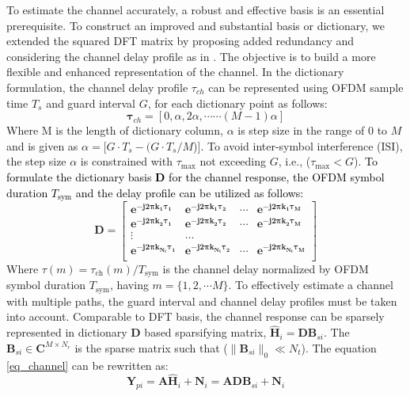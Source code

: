 To estimate the channel accurately, a robust and effective basis is an essential prerequisite. To construct an improved and substantial basis or dictionary, we extended the squared DFT matrix by proposing added redundancy and considering the channel delay profile as in \cite{ourwork}. The objective is to build a more flexible and enhanced representation of the channel. In the dictionary formulation, the channel delay profile $\tau_{ch}$ can be represented using OFDM sample time $T_s$ and guard interval $G$, for each dictionary point as follows:
    \begin{equation}
\mathbf{    
\tau}_{ch}=[0,\alpha,2\alpha,\cdots \cdots (M-1)\alpha]
    \end{equation}  
 Where M is the length of dictionary column, $\alpha$ is step size in the range of $0$ to $M$ and is given as $\alpha=[G\cdot T_s-(G\cdot T_s/M$)]. To avoid inter-symbol interference (ISI), the step size $\alpha$ is constrained with $\tau_\text{max}$  not exceeding $G$, i.e., ($\tau_\text{max}< G$)\cite{reviwsparse}.
\textcolor{black}{To formulate the dictionary basis $\mathbf{D}$ for the channel response, the OFDM symbol duration $T_\text{sym}$ and the delay profile can be utilized as follows:}\\
\[
\mathbf{    D=
    \begin{bmatrix}
    e^{-j2\pi k_1 \tau_1} & e^{-j2\pi k_1 \tau_2}&\cdots& e^{-j2\pi k_1 \tau_M} \\
    e^{-j2\pi k_2 \tau_1} & e^{-j2\pi k_2 \tau_2}&\cdots& e^{-j2\pi k_2 \tau_M} \\
    \vdots & \dots & \\                                        
    e^{-j2\pi k_{N_t}\tau_1} & e^{-j2\pi k_{N_t}\tau_2} &\cdots& e^{-j2\pi k_{N_t}\tau_M} \\
    \end{bmatrix}
    }    \]
Where $\tau(m)=  \tau_\text{ch}(m)/T_\text{sym}$ is the channel delay normalized by OFDM symbol duration $T_\text{sym}$, having $m=\{1,2,\cdots M\}$. 
To effectively estimate a channel with multiple paths, the guard interval and channel delay profiles must be taken into account.
Comparable to DFT basis, the channel response can be sparsely represented in dictionary $\mathbf{D}$ based sparsifying matrix, $\mathbf{\hat{H}}_i=\mathbf{D} \mathbf{B}_{si}$. The $\mathbf{B}_{si}  \in \mathbf{C}^{M \times N_r}$ is the sparse matrix such that ($\|\mathbf{B}_{si} \|_0 \ll N_t$). The equation \ref{eq_channel} can be rewritten as:
\begin{equation}
    \mathbf{Y}_{pi}= \mathbf{A} \mathbf{\hat{H}}_i + \mathbf{N}_i= \mathbf{A} \mathbf{D} \mathbf{B}_{si}  +\mathbf{N}_i
    \label{eq-cs_model}
\end{equation}
